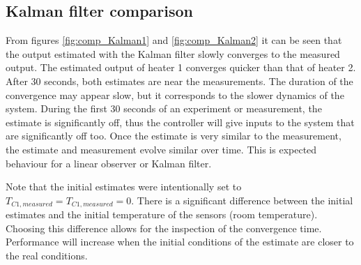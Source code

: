\subsection{Kalman filter comparison}
From figures \ref{fig:comp_Kalman1} and \ref{fig:comp_Kalman2} it can be seen that the output estimated with the Kalman filter slowly converges to the measured output. The estimated output of heater 1 converges quicker than that of heater 2. After 30 seconds, both estimates are near the measurements. The duration of the convergence may appear slow, but it corresponds to the slower dynamics of the system. During the first 30 seconds of an experiment or measurement, the estimate is significantly off, thus the controller will give inputs to the system that are significantly off too. Once the estimate is very similar to the measurement, the estimate and measurement evolve similar over time. This is expected behaviour for a linear observer or Kalman filter.

Note that the initial estimates were intentionally set to $T_{C1,measured} = T_{C1,measured} = 0$. There is a significant difference between the initial estimates and the initial temperature of the sensors (room temperature). Choosing this difference allows for the inspection of the convergence time. Performance will increase when the initial conditions of the estimate are closer to the real conditions.

